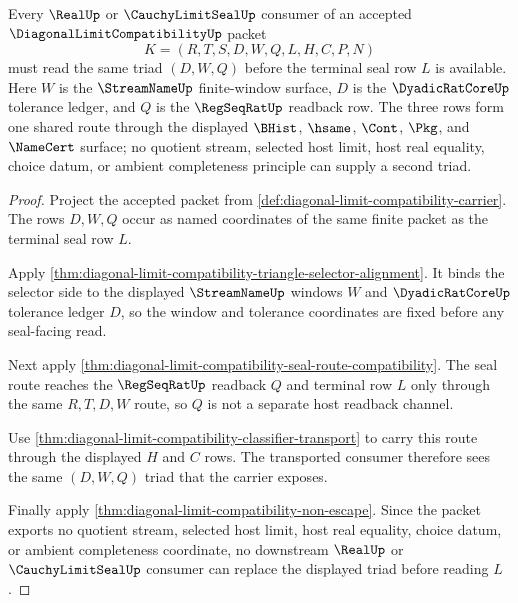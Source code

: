 \begin{theorem}
\label{thm:diagonal-limit-compatibility-window-budget-triad-lock}
Every $\RealUp$ or $\CauchyLimitSealUp$ consumer of an accepted $\DiagonalLimitCompatibilityUp$ packet
$$
K=(R,T,S,D,W,Q,L,H,C,P,N)
$$
must read the same triad $(D,W,Q)$ before the terminal seal row $L$ is available. Here $W$ is the $\StreamNameUp$ finite-window surface, $D$ is the $\DyadicRatCoreUp$ tolerance ledger, and $Q$ is the $\RegSeqRatUp$ readback row. The three rows form one shared route through the displayed $\BHist$, $\hsame$, $\Cont$, $\Pkg$, and $\NameCert$ surface; no quotient stream, selected host limit, host real equality, choice datum, or ambient completeness principle can supply a second triad.
\end{theorem}
\begin{proof}
Project the accepted packet from \autoref{def:diagonal-limit-compatibility-carrier}. The rows $D,W,Q$ occur as named coordinates of the same finite packet as the terminal seal row $L$.

Apply \autoref{thm:diagonal-limit-compatibility-triangle-selector-alignment}. It binds the selector side to the displayed $\StreamNameUp$ windows $W$ and $\DyadicRatCoreUp$ tolerance ledger $D$, so the window and tolerance coordinates are fixed before any seal-facing read.

Next apply \autoref{thm:diagonal-limit-compatibility-seal-route-compatibility}. The seal route reaches the $\RegSeqRatUp$ readback $Q$ and terminal row $L$ only through the same $R,T,D,W$ route, so $Q$ is not a separate host readback channel.

Use \autoref{thm:diagonal-limit-compatibility-classifier-transport} to carry this route through the displayed $H$ and $C$ rows. The transported consumer therefore sees the same $(D,W,Q)$ triad that the carrier exposes.

Finally apply \autoref{thm:diagonal-limit-compatibility-non-escape}. Since the packet exports no quotient stream, selected host limit, host real equality, choice datum, or ambient completeness coordinate, no downstream $\RealUp$ or $\CauchyLimitSealUp$ consumer can replace the displayed triad before reading $L$.
\end{proof}

